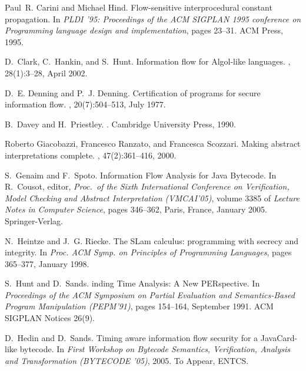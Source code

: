 \documentclass{sigplanconf}
\begin{document}
\begin{thebibliography}{ADvRF01}
Paul~R. Carini and Michael Hind.
\newblock Flow-sensitive interprocedural constant propagation.
\newblock In {\em PLDI '95: Proceedings of the ACM SIGPLAN 1995 conference on
  Programming language design and implementation}, pages 23--31. ACM Press,
  1995.

D.~Clark, C.~Hankin, and S.~Hunt.
\newblock Information flow for {Algol-like} languages.
, 28(1):3--28, April 2002.

D.~E. Denning and P.~J. Denning.
\newblock Certification of programs for secure information flow.
, 20(7):504--513, July 1977.

B.~Davey and H.~Priestley.
.
\newblock Cambridge University Press, 1990.

Roberto Giacobazzi, Francesco Ranzato, and Francesca Scozzari.
\newblock Making abstract interpretations complete.
, 47(2):361--416, 2000.

S.~Genaim and F.~Spoto.
\newblock Information {F}low {A}nalysis for {J}ava {B}ytecode.
\newblock In R.~Cousot, editor, {\em Proc.\ of the Sixth International
  Conference on Verification, Model Checking and Abstract Interpretation
  (VMCAI'05)}, volume 3385 of {\em Lecture Notes in Computer Science}, pages
  346--362, Paris, France, January 2005. Springer-Verlag.

N.~Heintze and J.~G. Riecke.
\newblock The {SLam} calculus: programming with secrecy and integrity.
\newblock In {\em Proc. ACM Symp. on Principles of Programming Languages},
  pages 365--377, January 1998.

S.~Hunt and D.~Sands.
inding {T}ime {A}nalysis: {A} {N}ew {PER}spective.
\newblock In {\em Proceedings of the {A}{C}{M} Symposium on Partial Evaluation
  and Semantics-Based Program Manipulation (PEPM'91)}, pages 154--164,
  September 1991.
\newblock ACM SIGPLAN Notices 26(9).

D.~Hedin and D.~Sands.
\newblock Timing aware information flow security for a {J}ava{C}ard-like
  bytecode.
\newblock In {\em First Workshop on Bytecode Semantics, Verification, Analysis
  and Transformation (BYTECODE '05)}, 2005.
\newblock To Appear, ENTCS.


\end{thebibliography}
\end{document}
